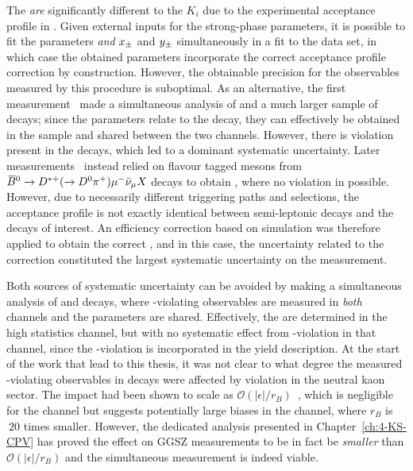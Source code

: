 The \Fi \emph{are} significantly different to the $K_i$ due to the experimental acceptance profile in \lhcb. Given external inputs for the strong-phase parameters, it is possible to fit the \Fi parameters \emph{and} $x_\pm$ and $y_\pm$ simultaneously in a fit to the \lhcb \BtoDK data set, in which case the obtained \Fi parameters incorporate the correct acceptance profile correction by construction. However, the obtainable precision for the \CP observables measured by this procedure is suboptimal. As an alternative, the first \lhcb measurement~\cite{LHCb-PAPER-2012-027} made a simultaneous analysis of \BtoDK and a much larger sample of \BtoDpi decays; since the \Fi parameters relate to the \D decay, they can effectively be obtained in the \Dpi sample  and shared between the two \BtoDh channels. However, there is \CP violation present in the \BtoDpi decays, which led to a dominant systematic uncertainty. Later \lhcb measurements~\cite{LHCb-PAPER-2014-041,LHCb-PAPER-2018-017} instead relied on flavour tagged \D mesons from ${{\kern 0.18em\overline{\kern -0.18em B}}{}^0}\rightarrow{\ensuremath{{D}^{*+}}}(\rightarrow {\ensuremath{{D}^0}} {\ensuremath{{\pi}^+}})\mu^- \bar \nu_\mu X$ decays to obtain \Fi, where no \CP violation in possible. However, due to necessarily different triggering paths and selections, the acceptance profile is not exactly identical between semi-leptonic decays and the \BtoDh decays of interest. An efficiency correction based on simulation was therefore applied to obtain the correct \Fi, and in this case,  the uncertainty related to the correction constituted the largest systematic uncertainty on the measurement.

Both sources of systematic uncertainty can be avoided by making a simultaneous analysis of \BtoDK and \BtoDpi decays, where \CP-violating observables are measured in \emph{both} channels and the \Fi parameters are shared. Effectively, the \Fi are determined in the high statistics \BtoDpi channel, but with no systematic effect from \CP-violation in that channel, since the \CP-violation is incorporated in the yield description. At the start of the work that lead to this thesis, it was not clear to what degree the measured \CP-violating observables in \BtoDpi decays were affected by \CP violation in the neutral kaon sector. The impact had been shown to scale as $\mathcal O(|\epsilon| / r_B)$~\cite{grossmanEffectsBarMixing2014}, which is negligible for the \BtoDK channel but suggests potentially large biases in the \BtoDpi channel, where $r_B$ is $~20$ times smaller. However, the dedicated analysis presented in Chapter~\ref{ch:4-KS-CPV} has proved the effect on GGSZ measurements to be in fact be \emph{smaller} than $\mathcal O(|\epsilon| / r_B)$ and the simultaneous measurement is indeed viable. 

